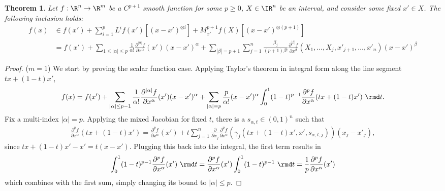 \documentclass{article}
\theoremstyle{plain}
\newtheorem{theorem}{Theorem}
\theoremstyle{remark}
\begin{document}
\begin{theorem}
Let $f:\R^n\to\R^m$ be a $C^{p+1}$ smooth function for some $p\geq 0$, $X\in\IR^n$ be an interval, and consider some fixed $x'\in X$.
The following inclusion holds:
\begin{align*}
    f(x) &\in f(x') + \sum_{i=1}^p L^i f(x') [(x - x')^{\otimes i}] + M^{p+1}_{x'} f (X) [(x - x')^{\otimes (p+1)}] \\
    &= f(x') + \sum_{1\leq |\alpha|\leq p} \frac{1}{\alpha!} \frac{\partial^{|\alpha|} f}{\partial x^\alpha} (x') (x - x')^{\alpha} 
    + \sum_{|\beta| = p+1} \sum_{j=1}^n \frac{\beta_j}{(p+1)\beta!} \frac{\partial^{|\beta|} f}{\partial x^\beta} (X_1,\dots,X_j,x'_{j+1},\dots,x'_n) (x - x')^\beta
\end{align*}
\end{theorem}
\begin{proof}
($m=1$) We start by proving the scalar function case.
Applying Taylor's theorem in integral form along the line segment $tx + (1-t)x'$, 
\begin{align*}
    f(x) = f(x') + \sum_{|\alpha|\leq p-1} \frac{1}{\alpha!} \frac{\partial^{|\alpha|} f}{\partial x^\alpha} (x') (x - x')^{\alpha} + \sum_{|\alpha|=p} \frac{p}{\alpha!} (x-x')^\alpha \int_0^1 (1-t)^{p-1} \frac{\partial^pf}{\partial x^\alpha} (tx + (1-t)x')\ \rmd t.
\end{align*}
Fix a multi-index $|\alpha| = p$. Applying the mixed Jacobian for fixed $t$, there is a $s_{\alpha,t} \in (0,1)^n$ such that
\begin{align*}
    \frac{\partial^pf}{\partial x^\alpha} (tx + (1-t)x') 
    = \frac{\partial^pf}{\partial x^\alpha} (x') + t \sum_{j=1}^n \frac{\partial}{\partial x_j} \frac{\partial^pf}{\partial x^\alpha} (\gamma_j(tx + (1-t)x', x', s_{\alpha,t,j})) (x_j - x'_j),
\end{align*}
since $tx + (1-t)x' - x' = t(x - x')$. 
Plugging this back into the integral, the first term results in
\begin{align*}
    \int_0^1 (1 - t)^{p-1} \frac{\partial^pf}{\partial x^\alpha} (x') \ \rmd t = 
    \frac{\partial^pf}{\partial x^\alpha} (x') \int_0^1 (1 - t)^{p-1} \ \rmd t = \frac1p \frac{\partial^p f}{\partial x^\alpha} (x')
\end{align*}
which combines with the first sum, simply changing its bound to $|\alpha| \leq p$. 


\end{proof}
\end{document}
